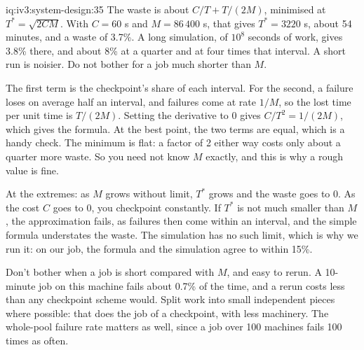 \begin{solution}{iq:iv3:system-design:35}
The waste is about $C/T + T/(2M)$, minimised at $T^* = \sqrt{2CM}$. With $C = 60$ s and $M = 86\,400$ s, that gives $T^* = 3220$ s, about 54 minutes, and a waste of 3.7\%. A long simulation, of $10^8$ seconds of work, gives 3.8\% there, and about 8\% at a quarter and at four times that interval. A short run is noisier. Do not bother for a job much shorter than $M$.
\label{lst:iv3:sd:checkpoint}

The first term is the checkpoint's share of each interval. For the second, a failure loses on average half an interval, and failures come at rate $1/M$, so the lost time per unit time is $T / (2M)$. Setting the derivative to 0 gives $C/T^2 = 1/(2M)$, which gives the formula. At the best point, the two terms are equal, which is a handy check. The minimum is flat: a factor of 2 either way costs only about a quarter more waste. So you need not know $M$ exactly, and this is why a rough value is fine.

At the extremes: as $M$ grows without limit, $T^*$ grows and the waste goes to 0. As the cost $C$ goes to 0, you checkpoint constantly. If $T^*$ is not much smaller than $M$, the approximation fails, as failures then come within an interval, and the simple formula understates the waste. The simulation has no such limit, which is why we run it: on our job, the formula and the simulation agree to within 15\%.

Don't bother when a job is short compared with $M$, and easy to rerun. A 10-minute job on this machine fails about 0.7\% of the time, and a rerun costs less than any checkpoint scheme would. Split work into small independent pieces where possible: that does the job of a checkpoint, with less machinery. The whole-pool failure rate matters as well, since a job over 100 machines fails 100 times as often.

\end{solution}

